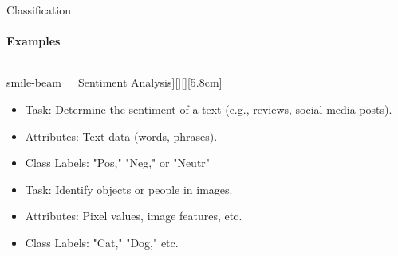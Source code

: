 \documentclass[aspectratio=169]{beamer}
\begin{document}


\begin{frame}{Classification}
    \framesubtitle{Examples}

    \vspace{-1.8cm}
    \begin{columns}
        \begin{column}{0.32\textwidth}
        
            \begin{coloredblock}[yellow][\faIcon[regular]{smile-beam}~~~Sentiment Analysis][\footnotesize\centering][][5.8cm]
                \begin{itemize}
                    \item \scriptsize Task: Determine the sentiment of a text (e.g., reviews, social media posts).
                    \item \scriptsize Attributes: Text data (words, phrases).
                    \item \scriptsize Class Labels: "Pos," "Neg," or "Neutr"
                \end{itemize}
            \end{coloredblock}
            \vspace{0.3cm}
            \begin{coloredblock}
                    \begin{itemize}
                        \item \scriptsize Task: Identify objects or people in images.
                        \item \scriptsize Attributes: Pixel values, image features, etc.
                        \item \scriptsize Class Labels: "Cat," "Dog," etc.
                    \end{itemize}
            \end{coloredblock}
            

\end{column}
\end{columns}
\end{frame}
\end{document}
